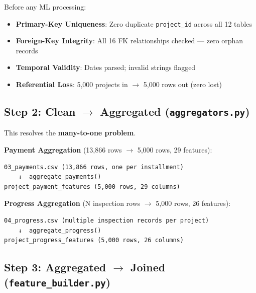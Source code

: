\documentclass[11pt,a4paper]{article}
\begin{document}
Before any ML processing:
\begin{itemize}[leftmargin=1.5em, itemsep=2pt, topsep=3pt]
\item \textbf{Primary-Key Uniqueness}: Zero duplicate \texttt{project\_id} across all 12 tables
\item \textbf{Foreign-Key Integrity}: All 16 FK relationships checked --- zero orphan records
\item \textbf{Temporal Validity}: Dates parsed; invalid strings flagged
\item \textbf{Referential Loss}: 5,000 projects in $\rightarrow$ 5,000 rows out (zero lost)
\end{itemize}

\subsection{Step 2: Clean $\rightarrow$ Aggregated (\texttt{aggregators.py})}

This resolves the \textbf{many-to-one problem}.

\textbf{Payment Aggregation} (13,866 rows $\rightarrow$ 5,000 rows, 29 features):
\begin{tcolorbox}[colback=gray!5!white,colframe=gray!60!black,arc=1mm,boxrule=0.6pt,left=6pt,right=6pt,top=6pt,bottom=6pt]
\begin{lstlisting}[basicstyle=\ttfamily\scriptsize,breaklines=true,columns=flexible]
03_payments.csv (13,866 rows, one per installment)
    ↓  aggregate_payments()
project_payment_features (5,000 rows, 29 columns)
\end{lstlisting}
\end{tcolorbox}


\textbf{Progress Aggregation} (N inspection rows $\rightarrow$ 5,000 rows, 26 features):
\begin{tcolorbox}[colback=gray!5!white,colframe=gray!60!black,arc=1mm,boxrule=0.6pt,left=6pt,right=6pt,top=6pt,bottom=6pt]
\begin{lstlisting}[basicstyle=\ttfamily\scriptsize,breaklines=true,columns=flexible]
04_progress.csv (multiple inspection records per project)
    ↓  aggregate_progress()
project_progress_features (5,000 rows, 26 columns)
\end{lstlisting}
\end{tcolorbox}


\subsection{Step 3: Aggregated $\rightarrow$ Joined (\texttt{feature\_builder.py})}
\end{document}
